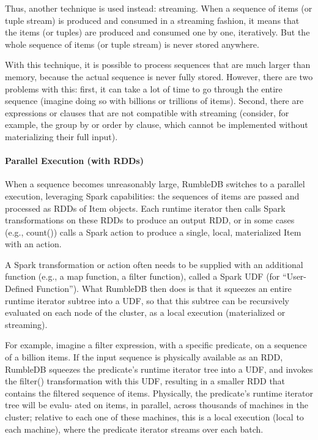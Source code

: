 Thus, another technique is used instead: streaming. When a sequence of items (or tuple stream) is produced and consumed in a streaming fashion, it means that the items (or tuples) are produced and consumed one by one, iteratively. But the whole sequence of items (or tuple stream) is never stored anywhere.

With this technique, it is possible to process sequences that are much larger than memory, because the actual sequence is never fully stored. However, there are two problems with this: first, it can take a lot of time to go through the entire sequence (imagine doing so with billions or trillions of items). Second, there are expressions or clauses that are not compatible with streaming (consider, for example, the group by or order by clause, which cannot be implemented without materializing their full input).

\paragraph{Parallel Execution (with RDDs)}
When a sequence becomes unreasonably large, RumbleDB switches to a parallel execution, leveraging Spark capabilities: the sequences of items are passed and processed as RDDs of Item objects. Each runtime iterator then calls Spark transformations on these RDDs to produce an output RDD, or in some cases (e.g., count()) calls a Spark action to produce a single, local, materialized Item with an action.

A Spark transformation or action often needs to be supplied with an additional function (e.g., a map function, a filter function), called a Spark UDF (for “User-Defined Function”). What RumbleDB then does is that it squeezes an entire runtime iterator subtree into a UDF, so that this subtree can be recursively evaluated on each node of the cluster, as a local execution (materialized or streaming).

For example, imagine a filter expression, with a specific predicate, on a sequence of a billion items. If the input sequence is physically available as an RDD, RumbleDB squeezes the predicate's runtime iterator tree into a UDF, and invokes the filter() transformation with this UDF, resulting in a smaller RDD that contains the filtered sequence of items. Physically, the predicate's runtime iterator tree will be evalu- ated on items, in parallel, across thousands of machines in the cluster; relative to each one of these machines, this is a local execution (local to each machine), where the predicate iterator streams over each batch.

